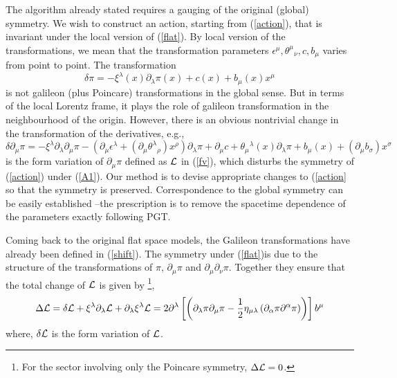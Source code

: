 \documentclass[12pt]{article}
\begin{document}
The algorithm already stated requires a gauging of the original (global) symmetry. We wish to construct an action, starting from (\ref{action}), that is invariant under the local version of (\ref{flat}). By local version of the transformations, we mean that the transformation parameters $\epsilon^\mu,\theta^\mu{}_\nu, c, b_\mu$ varies from point to point. The transformation 
\begin{equation}
\delta \pi=-\xi^{\lambda}(x)\partial_{\lambda}\pi(x)+c(x)+b_{\mu}(x)x^{\mu}\label{A1}
\end{equation}
is not galileon (plus
Poincare) transformations in the global sense. But in terms of the local Lorentz frame, it plays the role of galileon transformation in the neighbourhood of the origin. However,
there is an obvious nontrivial change in the transformation of the derivatives, e.g.,
\begin{equation}
\delta\partial_\mu\pi = -\xi^\lambda\partial_\lambda
\partial_\mu \pi-(\partial_{\mu}\epsilon^{\lambda}+(\partial_{\mu}{\theta^{\lambda}}_{\rho})x^{\rho})\partial_{\lambda}\pi +\partial_{\mu}c+ \theta_\mu{}^
\lambda(x)\partial_\lambda\pi +b_\mu(x)+(\partial_{\mu}b_{\sigma})x^{\sigma}\label{A2}
\end{equation} is the form variation of $\partial_\mu\pi$ defined as $\cal{L}$ in (\ref{fv}), which disturbs the symmetry of (\ref{action}) under
(\ref{A1}). Our method is to devise appropriate changes to 
(\ref{action} so that the symmetry is preserved. Correspondence to the global symmetry can be
easily established --the prescription is to remove the spacetime dependence of the parameters exactly following PGT.


Coming back to the original flat space models, the Galileon transformations have already been defined in (\ref{shift}). 
 The symmetry under (\ref{flat})is due to the structure of the transformations of $\pi$,  $\partial_\mu\pi$
 and $\partial_\mu\partial_\nu\pi$. Together they ensure that the total change of ${\cal{L}}$ is given by \footnote{For the sector involving only the Poincare symmetry, $\Delta {\cal{L}} =0$.},
\begin{eqnarray}
\Delta {\cal{L}} = \delta {\cal{L}} + \xi^\lambda\partial_\lambda{\cal{L}} +\partial_ \lambda \xi^\lambda
{\cal{L}} = 2\partial^\lambda\left[	\left(\partial_\lambda\pi\partial_\mu\pi - \frac{1}{2}\eta_{\mu\lambda}\left(\partial_\alpha\pi\partial^\alpha\pi\right)\right)\right]b^\mu\label{cond}
\end{eqnarray} 
where, $\delta {\cal{L}}$ is the form variation of ${\cal{L}}$.
 
\end{document}
